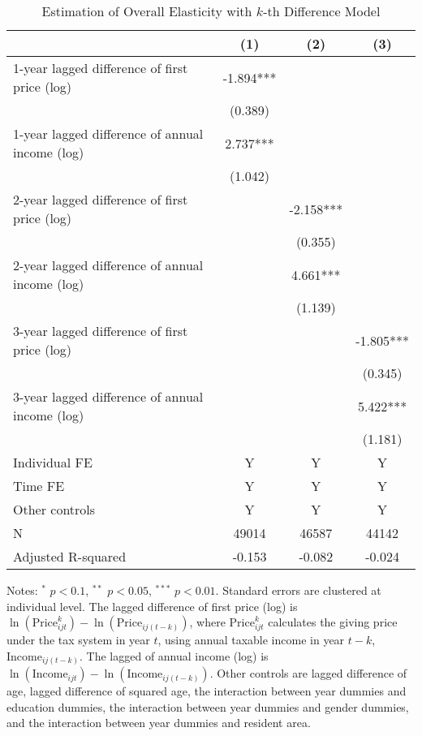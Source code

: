 \documentclass[
  11pt,
  a4paper,
]{article}
\begin{document}
\begin{table}

\caption{\label{tab:kdiffOverall}Estimation of Overall Elasticity with $k$-th Difference Model}
\centering
\fontsize{7}{9}\selectfont
\begin{threeparttable}
\begin{tabular}[t]{lccc}
\toprule
 & (1) & (2) & (3)\\
\midrule
1-year lagged difference of first price (log) & -1.894*** &  & \\
 & (0.389) &  & \\
1-year lagged difference of annual income (log) & 2.737*** &  & \\
 & (1.042) &  & \\
2-year lagged difference of first price (log) &  & -2.158*** & \\
 &  & (0.355) & \\
2-year lagged difference of annual income (log) &  & 4.661*** & \\
 &  & (1.139) & \\
3-year lagged difference of first price (log) &  &  & -1.805***\\
 &  &  & (0.345)\\
3-year lagged difference of annual income (log) &  &  & 5.422***\\
 &  &  & (1.181)\\
Individual FE & Y & Y & Y\\
Time FE & Y & Y & Y\\
Other controls & Y & Y & Y\\
N & 49014 & 46587 & 44142\\
Adjusted R-squared & -0.153 & -0.082 & -0.024\\
\bottomrule
\end{tabular}
\begin{tablenotes}
\item Notes: $^{*}$ $p < 0.1$, $^{**}$ $p < 0.05$, $^{***}$ $p < 0.01$. Standard errors are clustered at individual level. The lagged difference of first price (log) is $\ln(\text{Price}^k_{ijt}) - \ln(\text{Price}_{ij(t-k)})$, where $\text{Price}^k_{ijt}$ calculates the giving price under the tax system in year $t$, using annual taxable income in year $t-k$, $\text{Income}_{ij(t-k)}$. The lagged of annual income (log) is $\ln(\text{Income}_{ijt}) - \ln(\text{Income}_{ij(t-k)})$. Other controls are lagged difference of age, lagged difference of squared age, the interaction between year dummies and education dummies, the interaction between year dummies and gender dummies, and the interaction between year dummies and resident area.
\end{tablenotes}
\end{threeparttable}
\end{table}
\end{document}
